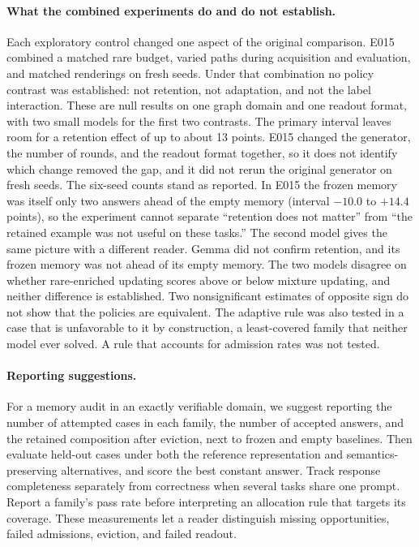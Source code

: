 \documentclass[11pt]{article}
\begin{document}
\paragraph{What the combined experiments do and do not establish.}
Each exploratory control changed one aspect of the original comparison.
E015 combined a matched rare budget, varied paths during acquisition
and evaluation, and matched renderings on fresh seeds. Under that
combination no policy contrast was established: not retention, not
adaptation, and not the label interaction. These are null results on
one graph domain and one readout format, with two small models for the
first two contrasts. The primary
interval leaves room for a retention effect of up to about 13 points.
E015 changed the generator, the number of rounds, and the readout
format together, so it does not identify which change removed the gap,
and it did not rerun the original generator on fresh seeds. The
six-seed counts stand as reported. In E015 the frozen memory was
itself only two answers ahead of the empty memory (interval $-10.0$ to
$+14.4$ points), so the experiment cannot separate ``retention does
not matter'' from ``the retained example was not useful on these
tasks.'' The second model gives the same picture with a different
reader. Gemma did not confirm retention, and its frozen memory was not
ahead of its empty memory. The two models disagree on whether
rare-enriched updating scores above or below mixture updating, and
neither difference is established. Two nonsignificant estimates of
opposite sign do not show that the policies are equivalent. The adaptive rule was also tested
in a case that is unfavorable to it by construction, a least-covered
family that neither model ever solved. A rule that accounts for admission
rates was not tested.

\paragraph{Reporting suggestions.} For a memory audit in an exactly
verifiable domain, we suggest reporting the number of attempted cases
in each family, the number of accepted answers, and the retained
composition after eviction, next to frozen and empty baselines. Then
evaluate held-out cases under both the reference representation and
semantics-preserving alternatives, and score the best constant answer.
Track response completeness separately from correctness when several
tasks share one prompt. Report a family's pass rate before interpreting
an allocation rule that targets its coverage. These measurements let a
reader distinguish
missing opportunities, failed admissions, eviction, and failed readout.
\end{document}
